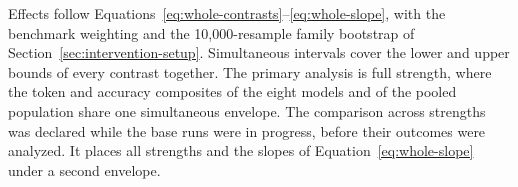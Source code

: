 Effects follow Equations~\eqref{eq:whole-contrasts}--\eqref{eq:whole-slope}, with the benchmark weighting and the 10,000-resample family bootstrap of Section~\ref{sec:intervention-setup}.
%
Simultaneous intervals cover the lower and upper bounds of every contrast together.
%
The primary analysis is full strength, where the token and accuracy composites of the eight models and of the pooled population share one simultaneous envelope.
%
The comparison across strengths was declared while the base runs were in progress, before their outcomes were analyzed.
%
It places all strengths and the slopes of Equation~\eqref{eq:whole-slope} under a second envelope.
%
